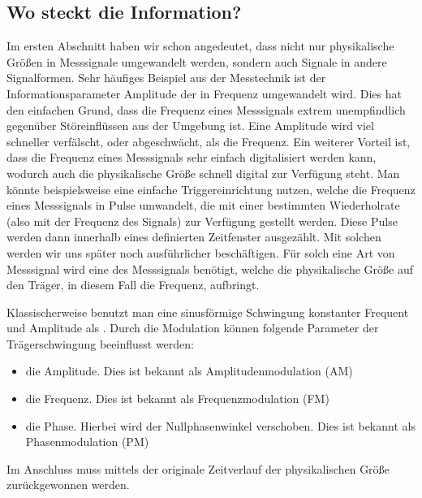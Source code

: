 \documentclass[letterpaper,10pt,english]{jupyterBook}
\begin{document}
\subsection{Wo steckt die Information? }
\label{\detokenize{content/3_basics:wo-steckt-die-information-a-id-subsec-information-a}}
\sphinxAtStartPar
Im ersten Abschnitt haben wir schon angedeutet, dass nicht nur physikalische Größen in Messsignale umgewandelt werden, sondern auch Signale in andere Signalformen. Sehr häufiges Beispiel aus der Messtechnik ist der Informationsparameter Amplitude der in Frequenz umgewandelt wird. Dies hat den einfachen Grund, dass die Frequenz eines Messsignals extrem unempfindlich gegenüber Störeinflüssen aus der Umgebung ist. Eine Amplitude wird viel schneller verfälscht, oder abgeschwächt, als die Frequenz. Ein weiterer Vorteil ist, dass die Frequenz eines Messsignals sehr einfach digitalisiert werden kann, wodurch auch die physikalische Größe schnell digital zur Verfügung steht. Man könnte beispielsweise eine einfache Triggereinrichtung nutzen, welche die Frequenz eines Messsignals in Pulse umwandelt, die mit einer bestimmten Wiederholrate (also mit der Frequenz des Signals) zur Verfügung gestellt werden. Diese Pulse werden dann innerhalb eines definierten Zeitfenster ausgezählt. Mit solchen  werden wir uns später noch ausführlicher beschäftigen. Für solch eine Art von Messsignal wird eine  des Messsignals benötigt, welche die physikalische Größe auf den Träger, in diesem Fall die Frequenz, aufbringt.

\sphinxAtStartPar
Klassischerweise benutzt man eine sinusförmige Schwingung konstanter Frequent und Amplitude als . Durch die Modulation können folgende Parameter der Trägerschwingung beeinflusst werden:
\begin{itemize}
\item {} 
\sphinxAtStartPar
die Amplitude. Dies ist bekannt als Amplitudenmodulation (AM)

\item {} 
\sphinxAtStartPar
die Frequenz. Dies ist bekannt als Frequenzmodulation (FM)

\item {} 
\sphinxAtStartPar
die Phase. Hierbei wird der Nullphasenwinkel verschoben. Dies ist bekannt als Phasenmodulation (PM)

\end{itemize}

\sphinxAtStartPar
Im Anschluss muss mittels  der originale Zeitverlauf der physikalischen Größe zurückgewonnen werden.
\end{document}

